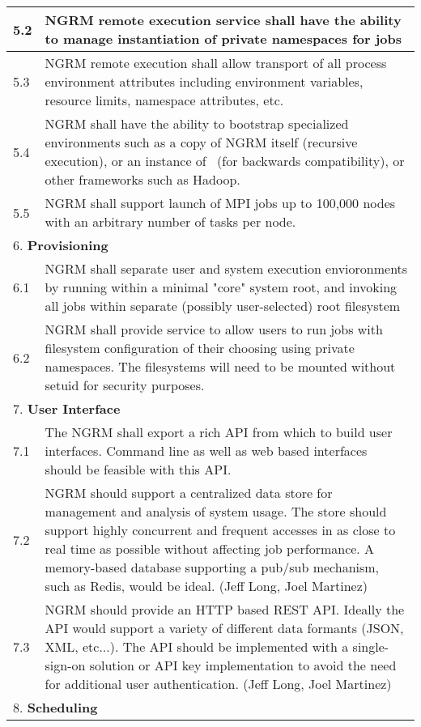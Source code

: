 \begin{longtable}{|p{1cm}|p{15cm}|}
  \hline
  5.2 & NGRM remote execution service shall have the ability to manage
	instantiation of private namespaces for jobs\\
  \hline
  5.3 & NGRM remote execution shall allow transport of all process environment
	attributes including environment variables, resource limits,
	namespace attributes, etc.\\
  \hline
  5.4 & NGRM shall have the ability to bootstrap specialized environments
	such as a copy of NGRM itself (recursive execution), or an instance
	of \slurm\ (for backwards compatibility), or other frameworks such as
	Hadoop.\\
  \hline
  5.5 & NGRM shall support launch of MPI jobs up to 100,000 nodes with an
	arbitrary number of tasks per node.\\
  \hline
  \multicolumn{2}{|l|}{6. \textbf{Provisioning}} \\
  \hline
  6.1 & NGRM shall separate user and system execution envioronments by
	running within a minimal "core" system root, and invoking all jobs
	within separate (possibly user-selected) root filesystem\\
  \hline
  6.2 & NGRM shall provide service to allow users to run jobs with
	filesystem configuration of their choosing using private namespaces.
	The filesystems will need to be mounted without setuid for security
	purposes.\\
  \hline
  \multicolumn{2}{|l|}{7. \textbf{User Interface}} \\
  \hline
  7.1 & The NGRM shall export a rich API from which to build user interfaces.
	Command line as well as web based interfaces should be feasible with
	this API.\\
  \hline
  7.2 & NGRM should support a centralized data store for management and
	analysis of system usage. The store should support highly concurrent
	and frequent accesses in as close to real time as possible without
	affecting job performance. A memory-based database supporting a
	pub/sub mechanism, such as Redis, would be ideal. (Jeff Long,
	Joel Martinez)\\
  \hline
  7.3 & NGRM should provide an HTTP based REST API. Ideally the API would
	support a variety of different data formants (JSON, XML, etc...).
	The API should be implemented with a single-sign-on solution or
	API key implementation to avoid the need for additional user
	authentication. (Jeff Long, Joel Martinez)\\
  \hline
  \multicolumn{2}{|l|}{8. \textbf{Scheduling}} \\

\end{longtable}
